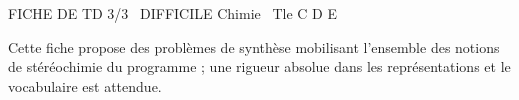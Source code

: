 \documentclass[11pt]{article}
\begin{document}
\begin{tcolorbox}[enhanced,colback=popink,colframe=popink,arc=10pt,boxrule=0pt,left=12pt,right=12pt,top=9pt,bottom=9pt]
{\color{white}\popxbold\small FICHE DE TD 3/3 \textbullet\ DIFFICILE \hfill Chimie \textbullet\ Tle C D E\par}
\end{tcolorbox}
\vspace{4pt}
Cette fiche propose des problèmes de synthèse mobilisant l'ensemble des notions de stéréochimie du programme ; une rigueur absolue dans les représentations et le vocabulaire est attendue.
\end{document}
